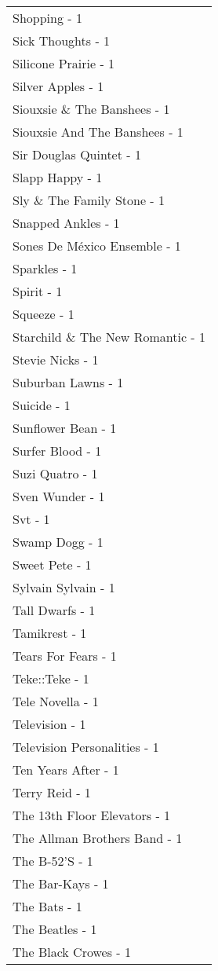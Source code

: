 \documentclass[
]{article}
\begin{document}
\begin{longtable}{l}
Shopping - 1 \\ 
Sick Thoughts - 1 \\ 
Silicone Prairie - 1 \\ 
Silver Apples - 1 \\ 
Siouxsie \& The Banshees - 1 \\ 
Siouxsie And The Banshees - 1 \\ 
Sir Douglas Quintet - 1 \\ 
Slapp Happy - 1 \\ 
Sly \& The Family Stone - 1 \\ 
Snapped Ankles - 1 \\ 
Sones De México Ensemble - 1 \\ 
Sparkles - 1 \\ 
Spirit - 1 \\ 
Squeeze - 1 \\ 
Starchild \& The New Romantic - 1 \\ 
Stevie Nicks - 1 \\ 
Suburban Lawns - 1 \\ 
Suicide - 1 \\ 
Sunflower Bean - 1 \\ 
Surfer Blood - 1 \\ 
Suzi Quatro - 1 \\ 
Sven Wunder - 1 \\ 
Svt - 1 \\ 
Swamp Dogg - 1 \\ 
Sweet Pete - 1 \\ 
Sylvain Sylvain - 1 \\ 
Tall Dwarfs - 1 \\ 
Tamikrest - 1 \\ 
Tears For Fears - 1 \\ 
Teke::Teke - 1 \\ 
Tele Novella - 1 \\ 
Television - 1 \\ 
Television Personalities - 1 \\ 
Ten Years After - 1 \\ 
Terry Reid - 1 \\ 
The 13th Floor Elevators - 1 \\ 
The Allman Brothers Band - 1 \\ 
The B-52'S - 1 \\ 
The Bar-Kays - 1 \\ 
The Bats - 1 \\ 
The Beatles - 1 \\ 
The Black Crowes - 1 \\ 

\end{longtable}
\end{document}
